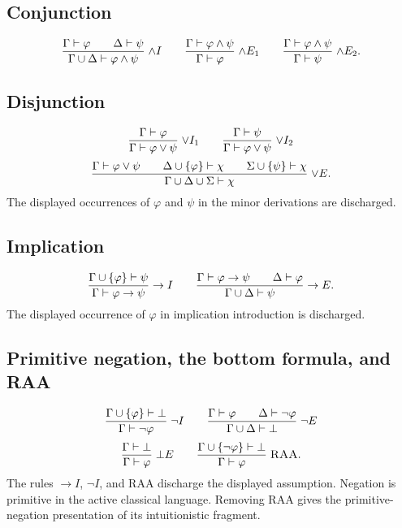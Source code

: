 \documentclass[11pt,oneside,openany]{book}
\theoremstyle{definition}
\theoremstyle{plain}
\theoremstyle{remark}
\DeclarePairedDelimiter{\set}{\lbrace}{\rbrace}
\newcommand{\derives}{\vdash}
\newcommand{\bottom}{\bot}
\newcommand{\Rule}[3][]{\frac{#2}{#3}\;\textsc{#1}}
\begin{document}
\subsection*{Conjunction}
\[
\Rule[\(\land I\)]{\Gamma\derives\varphi\qquad\Delta\derives\psi}
{\Gamma\cup\Delta\derives\varphi\land\psi}
\qquad
\Rule[\(\land E_1\)]{\Gamma\derives\varphi\land\psi}
{\Gamma\derives\varphi}
\qquad
\Rule[\(\land E_2\)]{\Gamma\derives\varphi\land\psi}
{\Gamma\derives\psi}.
\]

\subsection*{Disjunction}
\[
\Rule[\(\lor I_1\)]{\Gamma\derives\varphi}
{\Gamma\derives\varphi\lor\psi}
\qquad
\Rule[\(\lor I_2\)]{\Gamma\derives\psi}
{\Gamma\derives\varphi\lor\psi}
\]
\[
\Rule[\(\lor E\)]{
\Gamma\derives\varphi\lor\psi\qquad
\Delta\cup\set\varphi\derives\chi\qquad
\Sigma\cup\set\psi\derives\chi}
{\Gamma\cup\Delta\cup\Sigma\derives\chi}.
\]
The displayed occurrences of \(\varphi\) and \(\psi\) in the minor
derivations are discharged.

\subsection*{Implication}
\[
\Rule[\(\to I\)]{\Gamma\cup\set\varphi\derives\psi}
{\Gamma\derives\varphi\to\psi}
\qquad
\Rule[\(\to E\)]{\Gamma\derives\varphi\to\psi\qquad
\Delta\derives\varphi}
{\Gamma\cup\Delta\derives\psi}.
\]
The displayed occurrence of \(\varphi\) in implication introduction is
discharged.

\subsection*{Primitive negation, the bottom formula, and RAA}
\[
\Rule[\(\neg I\)]{\Gamma\cup\set{\varphi}\derives\bottom}
{\Gamma\derives\neg\varphi}
\qquad
\Rule[\(\neg E\)]{\Gamma\derives\varphi\qquad
\Delta\derives\neg\varphi}
{\Gamma\cup\Delta\derives\bottom}
\]
\[
\Rule[\(\bottom E\)]{\Gamma\derives\bottom}
{\Gamma\derives\varphi}
\qquad
\Rule[RAA]{\Gamma\cup\set{\neg\varphi}\derives\bottom}
{\Gamma\derives\varphi}.
\]
The rules \(\to I\), \(\neg I\), and RAA discharge the displayed assumption.
Negation is primitive in the active classical language.  Removing RAA gives
the primitive-negation presentation of its intuitionistic fragment.
\end{document}
